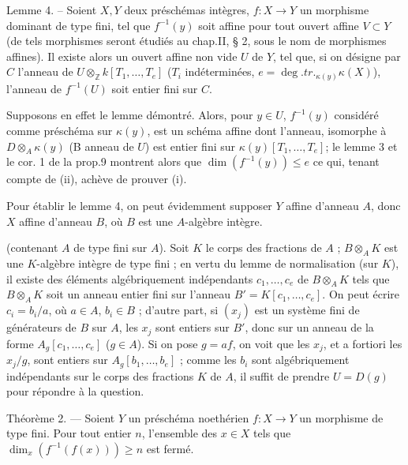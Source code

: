 Lemme 4. -- Soient $X, Y$ deux préschémas intègres, $f : X \to Y$ un morphisme dominant de type fini, tel que $f^{-1}(y)$ soit affine pour tout ouvert affine $V \subset Y$ (de tels morphismes seront étudiés au chap.II, § 2, sous le nom de morphismes affines). Il existe alors un ouvert affine non vide $U$ de $Y$, tel que, si on désigne par $C$ l'anneau de $U \otimes_{\mathbb{Z}} k[T_1, \dots, T_e]$ ($T_i$ indéterminées, $e = \deg.tr._{\kappa(y)}\kappa(X)$), l'anneau de $f^{-1}(U)$ soit entier fini sur $C$.

Supposons en effet le lemme démontré. Alors, pour $y \in U$, $f^{-1}(y)$ considéré comme préschéma sur $\kappa(y)$, est un schéma affine dont l'anneau, isomorphe à $D \otimes_A \kappa(y)$ (B anneau de $U$) est entier fini sur $\kappa(y)[T_1, \dots, T_e]$; le lemme 3 et le cor. 1 de la prop.9 montrent alors que $\dim(f^{-1}(y)) \le e$ ce qui, tenant compte de (ii), achève de prouver (i).

Pour établir le lemme 4, on peut évidemment supposer $Y$ affine d'anneau $A$, donc $X$ affine d'anneau $B$, où $B$ est une $A$-algèbre intègre.

\newpage


(contenant $A$ de type fini sur $A$). Soit $K$ le corps des fractions de $A$ ; $B \otimes_A K$ est une $K$-algèbre intègre de type fini ; en vertu du lemme de normalisation (sur $K$), il existe des éléments algébriquement indépendants $c_1, \dots, c_e$ de $B \otimes_A K$ tels que $B \otimes_A K$ soit un anneau entier fini sur l'anneau $B' = K[c_1, \dots, c_e]$. On peut écrire $c_i = b_i/a$, où $a \in A$, $b_i \in B$ ; d'autre part, si $(x_j)$ est un système fini de générateurs de $B$ sur $A$, les $x_j$ sont entiers sur $B'$, donc sur un anneau de la forme $A_g[c_1, \dots, c_e]$ ($g \in A$). Si on pose $g = af$, on voit que les $x_j$, et a fortiori les $x_j/g$, sont entiers sur $A_g[b_1, \dots, b_e]$ ; comme les $b_i$ sont algébriquement indépendants sur le corps des fractions $K$ de $A$, il suffit de prendre $U = D(g)$ pour répondre à la question.

Théorème 2. — Soient $Y$ un préschéma noethérien $f: X \to Y$ un morphisme de type fini. Pour tout entier $n$, l'ensemble des $x \in X$ tels que $\dim_x(f^{-1}(f(x))) \ge n$ est fermé.

